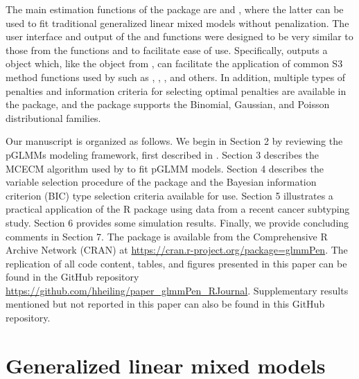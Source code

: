 The main estimation functions of the package are   and , where the latter can be used to fit traditional generalized linear mixed models without penalization. The user interface and output of the  and  functions were designed to be very similar to those from the functions  and  to facilitate ease of use. Specifically,  outputs a  object which, like the  object from , can facilitate the application of common S3 method functions used by  such as , , , and others. In addition, multiple types of penalties and information criteria for selecting optimal penalties are available in the package, and the package supports the Binomial, Gaussian, and Poisson distributional families.


Our manuscript is organized as follows. We begin in Section 2 by reviewing the pGLMMs modeling framework, first described in \cite{rashid2020}. Section 3 describes the MCECM algorithm used by  to fit pGLMM models. Section 4 describes the variable selection procedure of the package and the Bayesian information criterion (BIC) type selection criteria available for use. Section 5 illustrates a practical application of the  R package using data from a recent cancer subtyping study. Section 6 provides some simulation results. Finally, we provide concluding comments in Section 7. The package is available from the Comprehensive R Archive Network (CRAN) at \url{https://cran.r-project.org/package=glmmPen}. The replication of all code content, tables, and figures presented in this paper can be found in the GitHub repository \url{https://github.com/hheiling/paper_glmmPen_RJournal}. Supplementary results mentioned but not reported in this paper can also be found in this GitHub repository.

\section{Generalized linear mixed models}
\label{sec:modelinfo}

